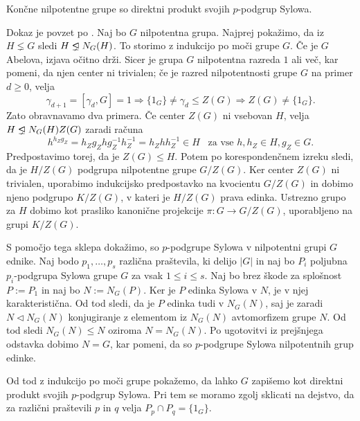 \begin{trditev}\label{trd_nilpotentne_so_produkti_sylowih}
    Končne nilpotentne grupe so direktni produkt svojih $p$-podgrup Sylowa.
\end{trditev}
\begin{dokaz}
    Dokaz je povzet po \cite{wikipedia2024nilpotent}.
    Naj bo $G$ nilpotentna grupa. Najprej pokažimo, da iz $H \lneq G$ sledi $H \propernormalsubgroup N_G(H)$. To storimo z indukcijo po moči grupe $G$.
    Če je $G$ Abelova, izjava očitno drži. Sicer je grupa $G$ nilpotentna razreda $1$ ali več, kar pomeni, da njen center ni trivialen; če je razred nilpotentnosti grupe $G$ na primer $d \ge 0$, velja \begin{equation*}
        \gamma_{d + 1} = [\gamma_d, G]  = 1 \Longrightarrow  \{ 1_G \} \neq \gamma_d \le Z(G) \Longrightarrow Z(G) \neq \{ 1_G \}.
    \end{equation*} 
     Zato obravnavamo dva primera. Če center $Z(G)$ ni vsebovan $H$, velja \\ $H \propernormalsubgroup N_G(H) Z(G)$ zaradi računa \begin{equation*}
        h^{h_Z g_Z} = h_Z g_Z h g_Z^{-1} h_Z^{-1} = h_Z h h_Z^{-1} \in H \, \, \, \text{ za vse } h, h_Z \in H, g_Z \in G.
    \end{equation*}
    Predpostavimo torej, da je $Z(G) \le H$. Potem po korespondenčnem izreku sledi, da je $H / Z(G)$ podgrupa nilpotentne grupe $G / Z(G)$.
    Ker center $Z(G)$ ni trivialen, uporabimo indukcijsko predpostavko na kvocientu $G / Z(G)$ in dobimo njeno podgrupo $K / Z(G)$, v kateri je $H/ Z(G)$ prava edinka.
    Ustrezno grupo za $H$ dobimo kot prasliko kanonične projekcije $\pi : G \to G / Z(G)$, uporabljeno na grupi $ K / Z(G)$.
    
    S pomočjo tega sklepa dokažimo, so $p$-podgrupe Sylowa v nilpotentni grupi $G$ ednike. Naj bodo $p_1, \ldots , p_s$ različna praštevila, ki delijo $\lvert G \rvert$ in naj bo $P_i$ poljubna $p_i$-podgrupa Sylowa grupe $G$ za vsak $1 \le i \le s$.
    Naj bo brez škode za splošnost $P := P_1$ in naj bo $N := N_G(P)$. Ker je $P$ edinka Sylowa v $N$, je v njej karakteristična. Od tod sledi, da je $P$ edinka tudi v $N_G(N)$, saj je zaradi $N \triangleleft N_G(N)$ konjugiranje z elementom iz $N_G(N)$
    avtomorfizem grupe $N$. Od tod sledi $N_G(N) \le N$ oziroma $N = N_G(N)$. Po ugotovitvi iz prejšnjega odstavka dobimo $N = G$, kar pomeni, da so $p$-podgrupe Sylowa nilpotentnih grup edinke.
    
    Od tod z indukcijo po moči grupe pokažemo, da lahko $G$ zapišemo kot direktni produkt svojih $p$-podgrup Sylowa. Pri tem se moramo zgolj
    sklicati na dejstvo, da za različni praštevili $p$ in $q$ velja $P_p \cap P_q = \{ 1_G \}$.
\end{dokaz}

